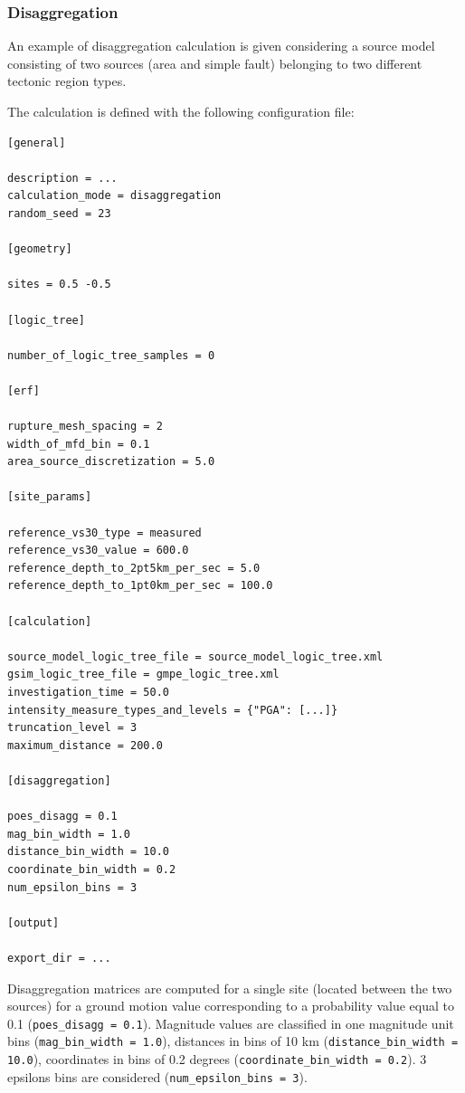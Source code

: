 \subsubsection{Disaggregation}
An example of disaggregation calculation is given considering a source model 
consisting of two sources (area and simple fault) belonging to two different 
tectonic region types.

The calculation is defined with the following configuration file:
\begin{Verbatim}[frame=single, commandchars=\\\{\}, fontsize=\normalsize]
[general]

description = ...
calculation_mode = disaggregation
random_seed = 23

[geometry]

sites = 0.5 -0.5

[logic_tree]

number_of_logic_tree_samples = 0

[erf]

rupture_mesh_spacing = 2
width_of_mfd_bin = 0.1
area_source_discretization = 5.0

[site_params]

reference_vs30_type = measured
reference_vs30_value = 600.0
reference_depth_to_2pt5km_per_sec = 5.0
reference_depth_to_1pt0km_per_sec = 100.0

[calculation]

source_model_logic_tree_file = source_model_logic_tree.xml
gsim_logic_tree_file = gmpe_logic_tree.xml
investigation_time = 50.0
intensity_measure_types_and_levels = {"PGA": [...]}
truncation_level = 3
maximum_distance = 200.0

[disaggregation]

poes_disagg = 0.1
mag_bin_width = 1.0
distance_bin_width = 10.0
coordinate_bin_width = 0.2
num_epsilon_bins = 3

[output]

export_dir = ...
\end{Verbatim}
Disaggregation matrices are computed for a single site (located between the two sources) for a ground motion value corresponding to a probability value equal to 0.1
(\texttt{poes\_\-disagg = 0.1}). Magnitude values are classified in one magnitude unit bins (\texttt{mag\_\-bin\_\-width = 1.0}), distances in bins of 10 km
(\texttt{distance\_\-bin\_\-width = 10.0}), coordinates in bins of 0.2 degrees (\texttt{coordinate\_\-bin\_\-width = 0.2}). 3 epsilons bins are considered (\texttt{num\_\-epsilon\_\-bins = 3}).

